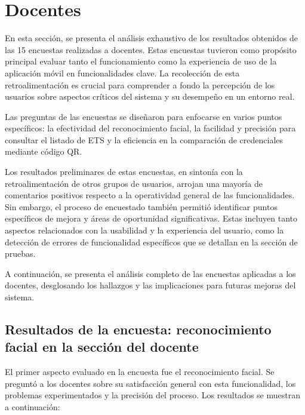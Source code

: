 \section{Docentes}

En esta sección, se presenta el análisis exhaustivo de los resultados obtenidos de las 15 encuestas realizadas a docentes. Estas encuestas tuvieron como propósito principal evaluar tanto el funcionamiento como la experiencia de uso de la aplicación móvil en funcionalidades clave. La recolección de esta retroalimentación es crucial para comprender a fondo la percepción de los usuarios sobre aspectos críticos del sistema y su desempeño en un entorno real. 

Las preguntas de las encuestas se diseñaron para enfocarse en varios puntos específicos: la efectividad del reconocimiento facial, la facilidad y precisión para consultar el listado de ETS y la eficiencia en la comparación de credenciales mediante código QR. 

Los resultados preliminares de estas encuestas, en sintonía con la retroalimentación de otros grupos de usuarios, arrojan una mayoría de comentarios positivos respecto a la operatividad general de las funcionalidades. Sin embargo, el proceso de encuestado también permitió identificar puntos específicos de mejora y áreas de oportunidad significativas. Estas incluyen tanto aspectos relacionados con la usabilidad y la experiencia del usuario, como la detección de errores de funcionalidad específicos que se detallan en la sección de pruebas.

A continuación, se presenta el análisis completo de las encuestas aplicadas a los docentes, desglosando los hallazgos y las implicaciones para futuras mejoras del sistema. 

\subsection{Resultados de la encuesta: reconocimiento facial en la sección del docente}

El primer aspecto evaluado en la encuesta fue el reconocimiento facial. Se preguntó a los docentes sobre su satisfacción general con esta funcionalidad, los problemas experimentados y la precisión del proceso. Los resultados se muestran a continuación:


